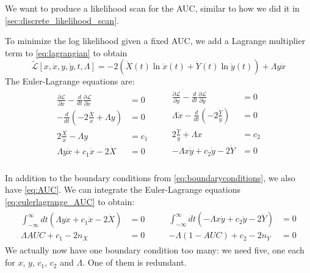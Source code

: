 \documentclass[11pt]{article}
\newcommand{\xdot}{\dot{x}}
\newcommand{\ydot}{\dot{y}}
\newcommand{\Xdot}{\dot{X}}
\newcommand{\Ydot}{\dot{Y}}
\newcommand{\AUC}{AUC}
\begin{document}
We want to produce a likelihood scan for the AUC, similar to how we did it in \cref{sec:discrete_likelihood_scan}.

To minimize the log likelihood given a fixed AUC, we add a Lagrange multiplier term to \cref{eq:lagrangian} to obtain
\begin{equation}
\mathcal{\tilde{L}}[x,\xdot,y,\ydot,t,\Lambda]=-2\left(\Xdot(t)\ln{\xdot(t)}+\Ydot(t)\ln{\ydot(t)}\right)+\Lambda y\xdot
\end{equation}
The Euler-Lagrange equations are:
\begin{align}
\begin{aligned}
\frac{\partial\mathcal{L}}{\partial x}-\frac{d}{dt}\frac{\partial\mathcal{L}}{\partial \xdot}&=0 \\
-\frac{d}{dt}\left(-2\frac{\Xdot}{\xdot}+\Lambda y\right)&=0 \\
2\frac{\Xdot}{\xdot}-\Lambda y&=c_1 \\
\Lambda y \xdot + c_1 \xdot - 2\Xdot&=0
\end{aligned}
\qquad
\begin{aligned}
\frac{\partial\mathcal{L}}{\partial y}-\frac{d}{dt}\frac{\partial\mathcal{L}}{\partial \ydot}&=0 \\
\Lambda \xdot-\frac{d}{dt}\left(-2\frac{\Ydot}{\ydot}\right)&=0 \\
2\frac{\Ydot}{\ydot}+\Lambda x&=c_2 \\
-\Lambda x \ydot + c_2 \ydot - 2\Ydot&=0 \\
\end{aligned}
\label{eq:eulerlagrange_AUC}
\end{align}

In addition to the boundary conditions from \cref{eq:boundaryconditions}, we also have \cref{eq:AUC}.  We can integrate the Euler-Lagrange equations \cref{eq:eulerlagrange_AUC} to obtain:
\begin{align}
\begin{aligned}
\int_{-\infty}^{\infty}dt\left(\Lambda y \xdot + c_1 \xdot - 2\Xdot\right)&=0 \\
\Lambda\AUC+c_1-2n_X&=0
\end{aligned}
\qquad
\begin{aligned}
\int_{-\infty}^{\infty}dt\left(-\Lambda x \ydot + c_2 \ydot - 2\Ydot\right)&=0 \\
-\Lambda(1-AUC)+c_2-2n_Y&=0
\end{aligned}
\label{eq:boundaryconditions_AUC}
\end{align}
We actually now have one boundary condition too many: we need five, one each for \(x\), \(y\), \(c_1\), \(c_2\) and \(\Lambda\).  One of them is redundant.
\end{document}
